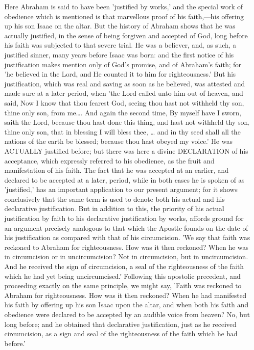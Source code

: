 \documentclass[
]{book}
\begin{document}
Here Abraham is said to have been 'justified by works,' and the special work of obedience which is mentioned is that marvellous proof of his faith,---his offering up his son Isaac on the altar. But the history of Abraham shows that he was actually justified, in the sense of being forgiven and accepted of God, long before his faith was subjected to that severe trial. He was a believer, and, as such, a justified sinner, many years before Isaac was born: and the first notice of his justification makes mention only of God's promise, and of Abraham's faith; for 'he believed in the Lord, and He counted it to him for righteousness.' But his justification, which was real and saving as soon as he believed, was attested and made sure at a later period, when 'the Lord called unto him out of heaven, and said, Now I know that thou fearest God, seeing thou hast not withheld thy son, thine only son, from me\ldots. And again the second time, By myself have I sworn, saith the Lord, because thou hast done this thing, and hast not withheld thy son, thine only son, that in blessing I will bless thee, \ldots{} and in thy seed shall all the nations of the earth be blessed; because thou hast obeyed my voice.' He was ACTUALLY justified before; but there was here a divine DECLARATION of his acceptance, which expressly referred to his obedience, as the fruit and manifestation of his faith. The fact that he was accepted at an earlier, and declared to be accepted at a later, period, while in both cases he is spoken of as 'justified,' has an important application to our present argument; for it shows conclusively that the same term is used to denote both his actual and his declarative justification. But in addition to this, the priority of his actual justification by faith to his declarative justification by works, affords ground for an argument precisely analogous to that which the Apostle founds on the date of his justification as compared with that of his circumcision. 'We say that faith was reckoned to Abraham for righteousness. How was it then reckoned? When he was in circumcision or in uncircumcision? Not in circumcision, but in uncircumcision. And he received the sign of circumcision, a seal of the righteousness of the faith which he had yet being uncircumcised.' Following this apostolic precedent, and proceeding exactly on the same principle, we might say, 'Faith was reckoned to Abraham for righteousness. How was it then reckoned? When he had manifested his faith by offering up his son Isaac upon the altar, and when both his faith and obedience were declared to be accepted by an audible voice from heaven? No, but long before; and he obtained that declarative justification, just as he received circumcision, as a sign and seal of the righteousness of the faith which he had before.'
\end{document}
